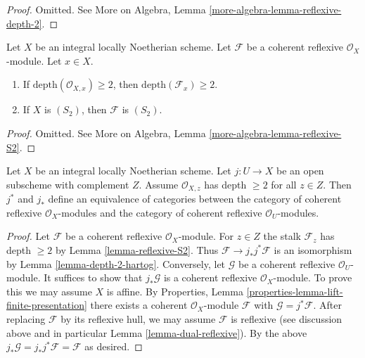\begin{proof}
Omitted. See More on Algebra, Lemma \ref{more-algebra-lemma-reflexive-depth-2}.
\end{proof}

\begin{lemma}
\label{lemma-reflexive-S2}
Let $X$ be an integral locally Noetherian scheme.
Let $\mathcal{F}$ be a coherent reflexive $\mathcal{O}_X$-module.
Let $x \in X$.
\begin{enumerate}
\item If $\text{depth}(\mathcal{O}_{X, x}) \geq 2$, then
$\text{depth}(\mathcal{F}_x) \geq 2$.
\item If $X$ is $(S_2)$, then $\mathcal{F}$ is $(S_2)$.
\end{enumerate}
\end{lemma}

\begin{proof}
Omitted. See More on Algebra, Lemma \ref{more-algebra-lemma-reflexive-S2}.
\end{proof}

\begin{lemma}
\label{lemma-reflexive-S2-extend}
Let $X$ be an integral locally Noetherian scheme. Let $j : U \to X$
be an open subscheme with complement $Z$. Assume $\mathcal{O}_{X, z}$
has depth $\geq 2$ for all $z \in Z$. Then $j^*$ and $j_*$ define
an equivalence of categories between the category of coherent reflexive
$\mathcal{O}_X$-modules and the category of coherent reflexive
$\mathcal{O}_U$-modules.
\end{lemma}

\begin{proof}
Let $\mathcal{F}$ be a coherent reflexive $\mathcal{O}_X$-module. For $z \in Z$
the stalk $\mathcal{F}_z$ has depth $\geq 2$ by Lemma \ref{lemma-reflexive-S2}.
Thus $\mathcal{F} \to j_*j^*\mathcal{F}$ is an isomorphism by
Lemma \ref{lemma-depth-2-hartog}. Conversely, let $\mathcal{G}$
be a coherent reflexive $\mathcal{O}_U$-module. It suffices to show that
$j_*\mathcal{G}$ is a coherent reflexive $\mathcal{O}_X$-module.
To prove this we may assume $X$ is affine. By Properties, Lemma
\ref{properties-lemma-lift-finite-presentation}
there exists a coherent $\mathcal{O}_X$-module $\mathcal{F}$
with $\mathcal{G} = j^*\mathcal{F}$. After replacing $\mathcal{F}$
by its reflexive hull, we may assume $\mathcal{F}$ is reflexive
(see discussion above and in particular Lemma \ref{lemma-dual-reflexive}).
By the above $j_*\mathcal{G} = j_*j^*\mathcal{F} = \mathcal{F}$
as desired.
\end{proof}

